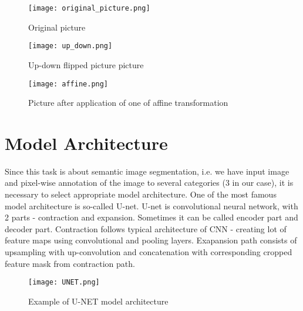 \documentclass{homework}
\begin{document}
\begin{figure}[H]
\texttt{[image: original\_picture.png]}
\caption{Original picture}
\centering
\end{figure}

\begin{figure}[H]
\texttt{[image: up\_down.png]}
\caption{Up-down flipped picture picture}
\centering
\end{figure}

\begin{figure}[H]
\texttt{[image: affine.png]}
\caption{Picture after application of one of affine transformation}
\centering
\end{figure}


\section{Model Architecture}
Since this task is about semantic image segmentation, i.e. we have input image and pixel-wise annotation of the image to several categories (3 in our case), it is necessary to select appropriate model architecture. One of the most famous model architecture is so-called U-net. U-net is convolutional neural network, with 2 parts - contraction and expansion. Sometimes it can be called encoder part and decoder part. Contraction follows typical architecture of CNN - creating lot of feature maps using convolutional and pooling layers. Exapansion path consists of upsampling with up-convolution and concatenation with corresponding cropped feature mask from contraction path.

\begin{figure}[H]
\centering
\texttt{[image: UNET.png]}
\caption{Example of U-NET model architecture}
\centering
\end{figure}
\end{document}
